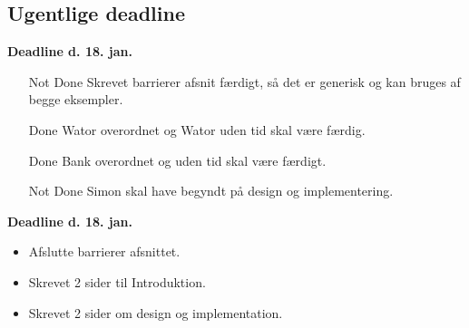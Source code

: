 \subsection*{Ugentlige deadline}
\textbf{Deadline d. 18. jan.}
\begin{itemize}{}{}\tightlist
\item [Not Done]Skrevet barrierer afsnit færdigt, så det er generisk og kan bruges af begge eksempler.
\item [Done]Wator overordnet og Wator uden tid skal være færdig.
\item [Done]Bank overordnet og uden tid skal være færdigt. 
\item [Not Done]Simon skal have begyndt på design og implementering.
\end{itemize}

\textbf{Deadline d. 18. jan.}
\begin{itemize}{}{}\tightlist
\item Afslutte barrierer afsnittet.
\item Skrevet 2 sider til Introduktion.
\item Skrevet 2 sider om design og implementation.
\end{itemize} 
